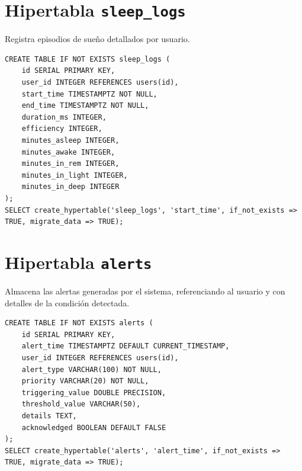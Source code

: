 \section*{Hipertabla \texttt{sleep\_logs}}
Registra episodios de sueño detallados por usuario.

\begin{verbatim}
CREATE TABLE IF NOT EXISTS sleep_logs (
    id SERIAL PRIMARY KEY,
    user_id INTEGER REFERENCES users(id),
    start_time TIMESTAMPTZ NOT NULL,
    end_time TIMESTAMPTZ NOT NULL,
    duration_ms INTEGER,
    efficiency INTEGER,
    minutes_asleep INTEGER,
    minutes_awake INTEGER,
    minutes_in_rem INTEGER,
    minutes_in_light INTEGER,
    minutes_in_deep INTEGER
);
SELECT create_hypertable('sleep_logs', 'start_time', if_not_exists => TRUE, migrate_data => TRUE);
\end{verbatim}

\section*{Hipertabla \texttt{alerts}}
Almacena las alertas generadas por el sistema, referenciando al usuario y con detalles de la condición detectada.

\begin{verbatim}
CREATE TABLE IF NOT EXISTS alerts (
    id SERIAL PRIMARY KEY,
    alert_time TIMESTAMPTZ DEFAULT CURRENT_TIMESTAMP,
    user_id INTEGER REFERENCES users(id),
    alert_type VARCHAR(100) NOT NULL,
    priority VARCHAR(20) NOT NULL,
    triggering_value DOUBLE PRECISION,
    threshold_value VARCHAR(50),
    details TEXT,
    acknowledged BOOLEAN DEFAULT FALSE
);
SELECT create_hypertable('alerts', 'alert_time', if_not_exists => TRUE, migrate_data => TRUE);
\end{verbatim}